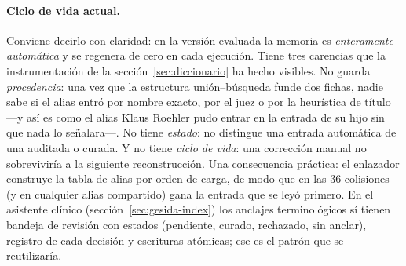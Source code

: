 \documentclass[11pt,a4paper]{article}
\begin{document}
\paragraph{Ciclo de vida actual.}
Conviene decirlo con claridad: en la versión evaluada la memoria es
\emph{enteramente automática} y se regenera de cero en cada ejecución.
Tiene tres carencias que la instrumentación de la
sección~\ref{sec:diccionario} ha hecho visibles. No guarda
\emph{procedencia}: una vez que la estructura unión--búsqueda funde dos
fichas, nadie sabe si el alias entró por nombre exacto, por el juez o por
la heurística de título ---y así es como el alias \guillemotleft{}Klaus Roehler\guillemotright{} pudo
entrar en la entrada de su hijo sin que nada lo señalara---. No tiene
\emph{estado}: no distingue una entrada automática de una auditada o
curada. Y no tiene \emph{ciclo de vida}: una corrección manual no
sobreviviría a la siguiente reconstrucción. Una consecuencia práctica: el
enlazador construye la tabla de alias por orden de carga, de modo que en
las $36$ colisiones (y en cualquier alias compartido) gana la entrada que
se leyó primero. En el asistente clínico (sección~\ref{sec:gesida-index})
los anclajes terminológicos sí tienen bandeja de revisión con estados
(pendiente, curado, rechazado, sin anclar), registro de cada decisión y
escrituras atómicas; ese es el patrón que se reutilizaría.
\end{document}
